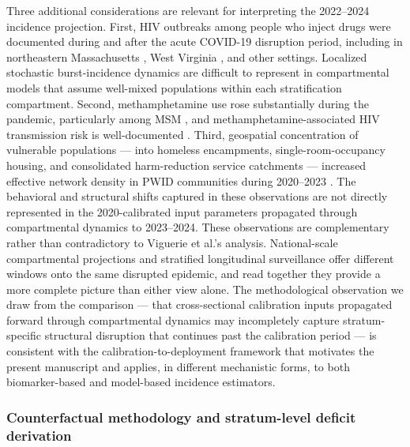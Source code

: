 \documentclass[11pt]{article}
\begin{document}
Three additional considerations are relevant for interpreting the 2022–2024 incidence projection. First, HIV outbreaks among people who inject drugs were documented during and after the acute COVID-19 disruption period, including in northeastern Massachusetts \cite{alpren2020,cranston2019}, West Virginia \cite{hershow2022}, and other settings. Localized stochastic burst-incidence dynamics are difficult to represent in compartmental models that assume well-mixed populations within each stratification compartment. Second, methamphetamine use rose substantially during the pandemic, particularly among MSM \cite{carrico2020}, and methamphetamine-associated HIV transmission risk is well-documented \cite{cohen2022}. Third, geospatial concentration of vulnerable populations — into homeless encampments, single-room-occupancy housing, and consolidated harm-reduction service catchments — increased effective network density in PWID communities during 2020–2023 \cite{hassan2022}. The behavioral and structural shifts captured in these observations are not directly represented in the 2020-calibrated input parameters propagated through compartmental dynamics to 2023–2024.
These observations are complementary rather than contradictory to Viguerie et al.'s analysis. National-scale compartmental projections and stratified longitudinal surveillance offer different windows onto the same disrupted epidemic, and read together they provide a more complete picture than either view alone. The methodological observation we draw from the comparison — that cross-sectional calibration inputs propagated forward through compartmental dynamics may incompletely capture stratum-specific structural disruption that continues past the calibration period — is consistent with the calibration-to-deployment framework that motivates the present manuscript and applies, in different mechanistic forms, to both biomarker-based and model-based incidence estimators.

\subsubsection{Counterfactual methodology and stratum-level deficit derivation}\label{sec:covid_methodology}
\end{document}
